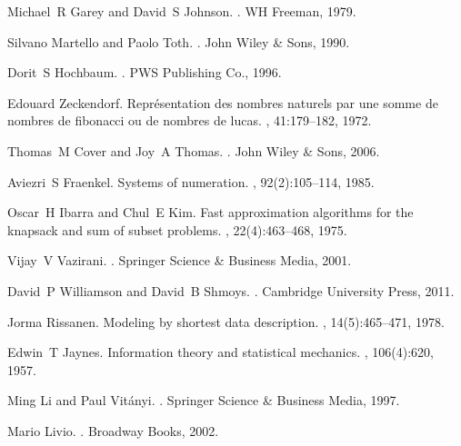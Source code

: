 \documentclass[11pt]{article}
\theoremstyle{remark}
\theoremstyle{definition}
\begin{document}

\begin{thebibliography}{12}

Michael~R Garey and David~S Johnson.
.
\newblock WH Freeman, 1979.

Silvano Martello and Paolo Toth.
.
\newblock John Wiley \& Sons, 1990.

Dorit~S Hochbaum.
.
\newblock PWS Publishing Co., 1996.

Edouard Zeckendorf.
\newblock Représentation des nombres naturels par une somme de nombres de fibonacci ou de nombres de lucas.
, 41:179--182, 1972.



Thomas~M Cover and Joy~A Thomas.
.
\newblock John Wiley \& Sons, 2006.

Aviezri~S Fraenkel.
\newblock Systems of numeration.
, 92(2):105--114, 1985.

Oscar~H Ibarra and Chul~E Kim.
\newblock Fast approximation algorithms for the knapsack and sum of subset problems.
, 22(4):463--468, 1975.

Vijay~V Vazirani.
.
\newblock Springer Science \& Business Media, 2001.

David~P Williamson and David~B Shmoys.
.
\newblock Cambridge University Press, 2011.

Jorma Rissanen.
\newblock Modeling by shortest data description.
, 14(5):465--471, 1978.

Edwin~T Jaynes.
\newblock Information theory and statistical mechanics.
, 106(4):620, 1957.

Ming Li and Paul Vit{\'a}nyi.
.
\newblock Springer Science \& Business Media, 1997.

Mario Livio.
.
\newblock Broadway Books, 2002.

\end{thebibliography}
\end{document}
